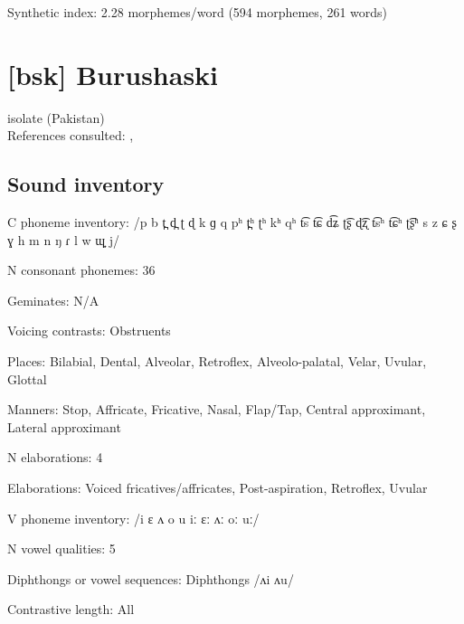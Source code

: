 {\begin{appendixdesc}
\item[Synthetic index:] 2.28 morphemes/word (594 morphemes, 261 words)
\end{appendixdesc}

\newpage\section*{[bsk] Burushaski} %
isolate (Pakistan)\medskip\\
References consulted: \citet{Anderson1997}, \citet{Yoshioka2012}

\subsection*{Sound inventory}
\begin{appendixdesc}

\item[C phoneme inventory:] /p b t̪ d̪ ʈ ɖ k ɡ q pʰ t̪ʰ ʈʰ kʰ qʰ t͡s t͡ɕ d͡ʑ ʈ͡ʂ ɖ͡ʐ t͡sʰ t͡ɕʰ ʈ͡ʂʰ s z ɕ ʂ ɣ h m n ŋ ɾ l w ɰ̟ j/

\item[N consonant phonemes:] 36

\item[Geminates:] N/A

\item[Voicing contrasts:] Obstruents

\item[Places:] Bilabial, Dental, Alveolar, Retroflex, Alveolo-palatal, Velar, Uvular, Glottal

\item[Manners:] Stop, Affricate, Fricative, Nasal, Flap/Tap, Central approximant, Lateral approximant

\item[N elaborations:] 4

\item[Elaborations:] Voiced fricatives/affricates, Post-aspiration, Retroflex, Uvular

\item[V phoneme inventory:] /i ɛ ʌ o u iː ɛː ʌː oː uː/

\item[N vowel qualities:] 5

\item[Diphthongs or vowel sequences:] Diphthongs /ʌi ʌu/

\item[Contrastive length:] All


\end{appendixdesc}}
